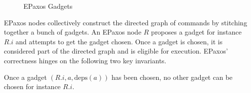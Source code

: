 \documentclass{mwhittaker}
\theoremstyle{definition}
\newcommand{\deps}[1]{\text{deps}(#1)}
\begin{document}
\begin{figure}[h]
  \centering

  \begin{subfigure}[b]{0.19\textwidth}
  \end{subfigure}
  \begin{subfigure}[b]{0.49\textwidth}
  \end{subfigure}
  \begin{subfigure}[b]{0.29\textwidth}
  \end{subfigure}

  \caption{EPaxos Gadgets}
\end{figure}

EPaxos nodes collectively construct the directed graph of commands by stitching
together a bunch of gadgets. An EPaxos node $R$ proposes a gadget for instance
$R.i$ and attempts to get the gadget chosen. Once a gadget is chosen, it is
considered part of the directed graph and is eligible for execution. EPaxos'
correctness hinges on the following two key invariants.

\begin{boxedinvariant}\label{inv:GadgetsChosen}
  Once a gadget $(R.i, a, \deps{a})$ has been chosen, no other gadget can be
  chosen for instance $R.i$.
\end{boxedinvariant}
\end{document}

